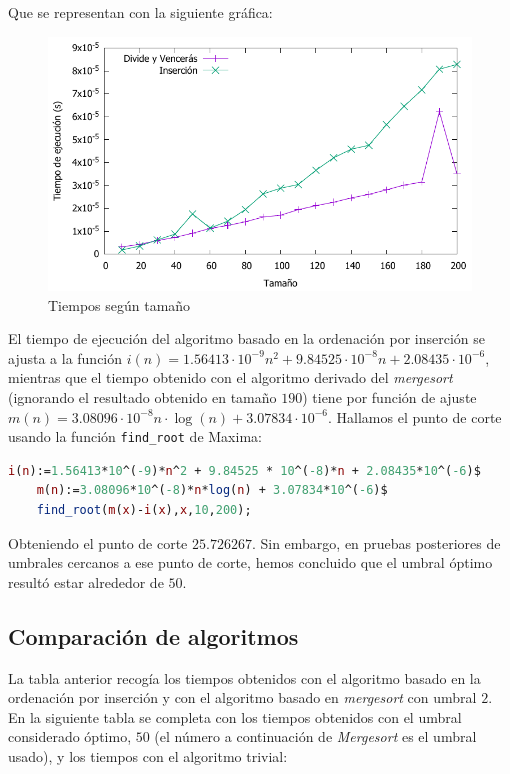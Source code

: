 \vspace*{1cm}

Que se representan con la siguiente gráfica:

\begin{figure}[H]\includegraphics[width=14cm]{img/umbral_preferencias.pdf} \centering
	\caption{Tiempos según tamaño}
\end{figure}

El tiempo de ejecución del algoritmo basado en la ordenación por inserción se ajusta a la función $i(n) = 1.56413 \cdot 10^{-9} n^2 + 9.84525 \cdot 10^{-8} n + 2.08435 \cdot 10^{-6}$, mientras que el tiempo obtenido con el algoritmo derivado del \textit{mergesort} (ignorando el resultado obtenido en tamaño $190$) tiene por función de ajuste $m(n) = 3.08096 \cdot 10^{-8} n \cdot \log(n) + 3.07834 \cdot 10^{-6}$. Hallamos el punto de corte usando la función \texttt{find\_root} de Maxima:

\begin{lstlisting}[language=Maxima]
	i(n):=1.56413*10^(-9)*n^2 + 9.84525 * 10^(-8)*n + 2.08435*10^(-6)$
	m(n):=3.08096*10^(-8)*n*log(n) + 3.07834*10^(-6)$
	find_root(m(x)-i(x),x,10,200);
\end{lstlisting}

Obteniendo el punto de corte $25.726267$. Sin embargo, en pruebas posteriores de umbrales cercanos a ese punto de corte, hemos concluido que el umbral óptimo resultó estar alrededor de $50$.

\subsection{Comparación de algoritmos}

La tabla anterior recogía los tiempos obtenidos con el algoritmo basado en la ordenación por inserción y con el algoritmo basado en \textit{mergesort} con umbral $2$. En la siguiente tabla se completa con los tiempos obtenidos con el umbral considerado óptimo, $50$ (el número a continuación de \textit{Mergesort} es el umbral usado), y los tiempos con el algoritmo trivial:

